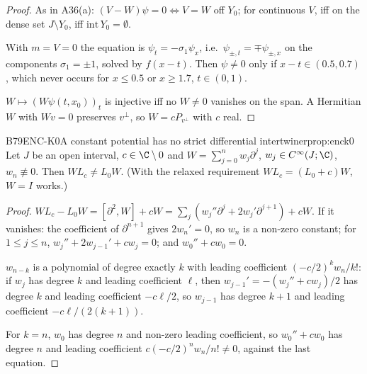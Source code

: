 \begin{proof}
As in A36(a): $(V-W)\psi=0\iff V=W$ off $Y_0$; for continuous $V$, iff on the dense set $J\setminus Y_0$, iff $\mathrm{int}\,Y_0=\emptyset$.

With $m=V=0$ the equation is $\psi_t=-\sigma_1\psi_x$, i.e.\ $\psi_{\pm,t}=\mp\psi_{\pm,x}$ on the components $\sigma_1=\pm1$, solved by $f(x-t)$. Then $\psi\ne0$ only if $x-t\in(0.5,0.7)$, which never occurs for $x\le0.5$ or $x\ge1.7$, $t\in(0,1)$.

$W\mapsto(W\psi(t,x_0))_t$ is injective iff no $W\ne0$ vanishes on the span. A Hermitian $W$ with $Wv=0$ preserves $v^\perp$, so $W=cP_{v^\perp}$ with $c$ real.

\end{proof}

\begin{dimcard}{B79}{ENC-K0}{A constant potential has no strict differential intertwiner}{\proved}{prop:enck0}
Let $J$ be an open interval, $c\in\C\setminus0$ and $W=\sum_{j=0}^nw_j\partial^j$, $w_j\in C^\infty(J;\C)$, $w_n\not\equiv0$. Then $WL_c\ne L_0W$. (With the relaxed requirement $WL_c=(L_0+c)W$, $W=I$ works.)
\end{dimcard}

\begin{proof}
$WL_c-L_0W=[\partial^2,W]+cW=\sum_j(w_j''\partial^j+2w_j'\partial^{j+1})+cW$. If it vanishes: the coefficient of $\partial^{n+1}$ gives $2w_n'=0$, so $w_n$ is a non-zero constant; for $1\le j\le n$, $w_j''+2w_{j-1}'+cw_j=0$; and $w_0''+cw_0=0$.

$w_{n-k}$ is a polynomial of degree exactly $k$ with leading coefficient $(-c/2)^kw_n/k!$: if $w_j$ has degree $k$ and leading coefficient $\ell$, then $w_{j-1}'=-(w_j''+cw_j)/2$ has degree $k$ and leading coefficient $-c\ell/2$, so $w_{j-1}$ has degree $k+1$ and leading coefficient $-c\ell/(2(k+1))$.

For $k=n$, $w_0$ has degree $n$ and non-zero leading coefficient, so $w_0''+cw_0$ has degree $n$ and leading coefficient $c(-c/2)^nw_n/n!\ne0$, against the last equation.

\end{proof}

